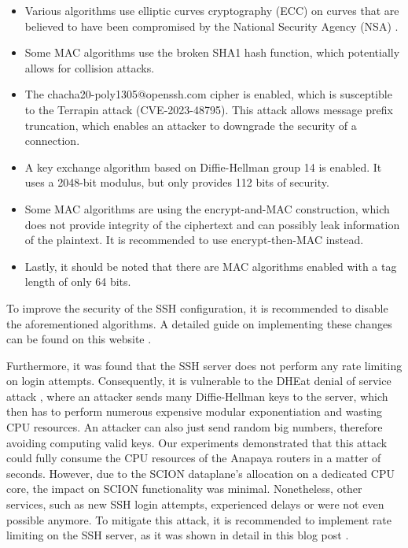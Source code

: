 \begin{itemize}
    \item Various algorithms use elliptic curves cryptography (ECC) on curves that are believed to have been compromised by the National Security Agency (NSA) \cite{nist1_safecurves}.
    \item Some MAC algorithms use the broken SHA1 hash function, which potentially allows for collision attacks.
    \item The chacha20-poly1305@openssh.com cipher is enabled, which is susceptible to the Terrapin attack (CVE-2023-48795).
    This attack allows message prefix truncation, which enables an attacker to downgrade the security of a connection.
    \item A key exchange algorithm based on Diffie-Hellman group 14 is enabled. It uses a 2048-bit modulus, but only provides 112 bits of security.
    \item Some MAC algorithms are using the encrypt-and-MAC construction, which does not provide integrity of the ciphertext and can possibly leak information of the plaintext.
    It is recommended to use encrypt-then-MAC instead.
    \item Lastly, it should be noted that there are MAC algorithms enabled with a tag length of only 64 bits.
\end{itemize}

To improve the security of the SSH configuration, it is recommended to disable the aforementioned algorithms.
A detailed guide on implementing these changes can be found on this website \cite{sshauditHardeningGuides}.


Furthermore, it was found that the SSH server does not perform any rate limiting on login attempts.
Consequently, it is vulnerable to the DHEat denial of service attack \cite{dheatAttack}, where an attacker sends many Diffie-Hellman keys to the server, which then has to perform numerous expensive modular exponentiation and wasting CPU resources.
An attacker can also just send random big numbers, therefore avoiding computing valid keys.
Our experiments demonstrated that this attack could fully consume the CPU resources of the Anapaya routers in a matter of seconds.
However, due to the SCION dataplane's allocation on a dedicated CPU core, the impact on SCION functionality was minimal.
Nonetheless, other services, such as new SSH login attempts, experienced delays or were not even possible anymore.
To mitigate this attack, it is recommended to implement rate limiting on the SSH server, as it was shown in detail in this blog post \cite{dheatAnalysis}.


